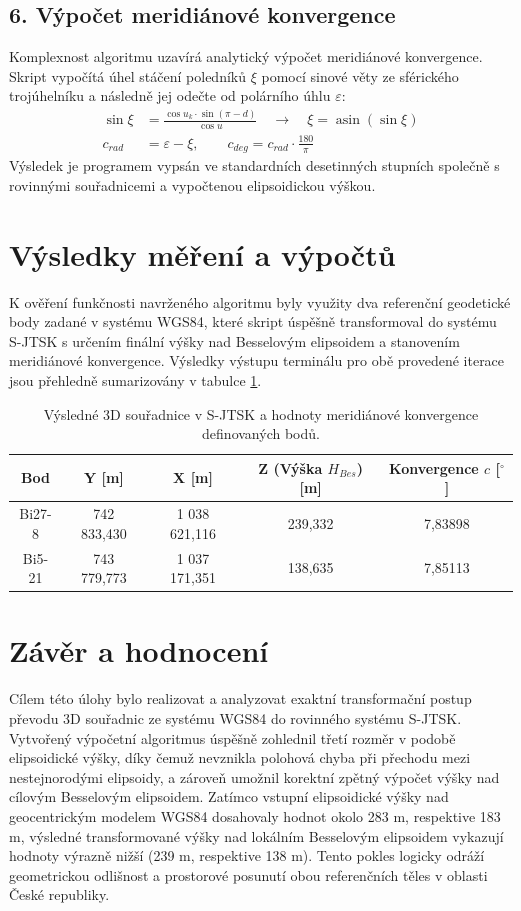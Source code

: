 \subsection*{6. Výpočet meridiánové konvergence}
Komplexnost algoritmu uzavírá analytický výpočet meridiánové konvergence. Skript vypočítá úhel stáčení poledníků $\xi$ pomocí sinové věty ze sférického trojúhelníku a následně jej odečte od polárního úhlu $\varepsilon$:
\begin{align*}
\sin \xi &= \frac{\cos u_k \cdot \sin(\pi - d)}{\cos u} \quad \rightarrow \quad \xi = \operatorname{asin}(\sin \xi) \\
c_{rad} &= \varepsilon - \xi, \qquad c_{deg} = c_{rad} \cdot \frac{180}{\pi}
\end{align*}
Výsledek je programem vypsán ve standardních desetinných stupních společně s rovinnými souřadnicemi a vypočtenou elipsoidickou výškou.

\section*{Výsledky měření a výpočtů}
K ověření funkčnosti navrženého algoritmu byly využity dva referenční geodetické body zadané v systému WGS84, které skript úspěšně transformoval do systému S-JTSK s určením finální výšky nad Besselovým elipsoidem a stanovením meridiánové konvergence.
Výsledky výstupu terminálu pro obě provedené iterace jsou přehledně sumarizovány v tabulce \ref{tab_vysledky}.

\begin{table}[h!]
    \centering
    \begin{tabular}{|c||c|c|c|c|}
        \hline
        Bod & Y [m] & X [m] & Z (Výška $H_{Bes}$) [m] & Konvergence $c$ [$^\circ$] \\
        \hline \hline
        Bi27-8 & 742 833,430 & 1 038 621,116 & 239,332 & 7,83898 \\
        \hline
        Bi5-21 & 743 779,773 & 1 037 171,351 & 138,635 & 7,85113 \\
        \hline
    \end{tabular}
    \caption{Výsledné 3D souřadnice v S-JTSK a hodnoty meridiánové konvergence definovaných bodů.}
    \label{tab_vysledky}
\end{table}

\section*{Závěr a hodnocení}
Cílem této úlohy bylo realizovat a analyzovat exaktní transformační postup převodu 3D souřadnic ze systému WGS84 do rovinného systému S-JTSK. Vytvořený výpočetní algoritmus úspěšně zohlednil třetí rozměr v podobě elipsoidické výšky, díky čemuž nevznikla polohová chyba při přechodu mezi nestejnorodými elipsoidy, a zároveň umožnil korektní zpětný výpočet výšky nad cílovým Besselovým elipsoidem. Zatímco vstupní elipsoidické výšky nad geocentrickým modelem WGS84 dosahovaly hodnot okolo 283 m, respektive 183 m, výsledné transformované výšky nad lokálním Besselovým elipsoidem vykazují hodnoty výrazně nižší (239 m, respektive 138 m). Tento pokles logicky odráží geometrickou odlišnost a prostorové posunutí obou referenčních těles v oblasti České republiky.


